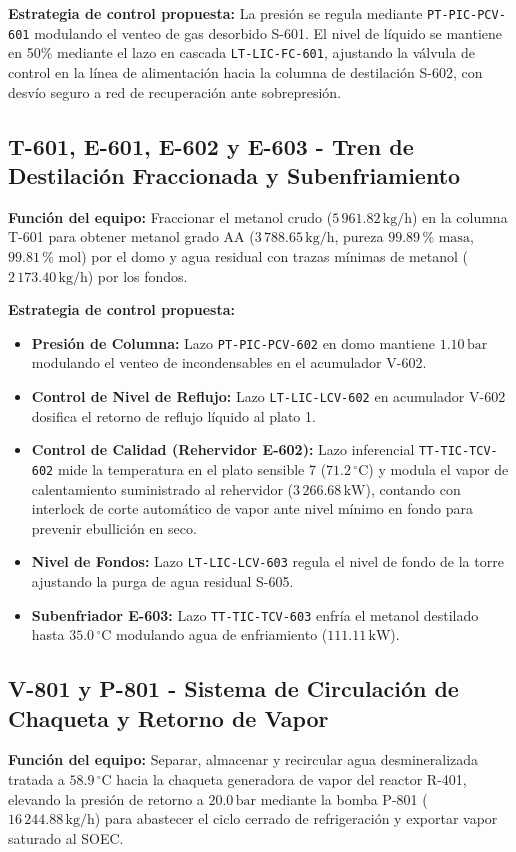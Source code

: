 \documentclass[10pt,letterpaper]{article}
\begin{document}
\textbf{Estrategia de control propuesta:} La presión se regula mediante \texttt{PT-PIC-PCV-601} modulando el venteo de gas desorbido S-601. El nivel de líquido se mantiene en 50\% mediante el lazo en cascada \texttt{LT-LIC-FC-601}, ajustando la válvula de control en la línea de alimentación hacia la columna de destilación S-602, con desvío seguro a red de recuperación ante sobrepresión.

\subsection{T-601, E-601, E-602 y E-603 - Tren de Destilación Fraccionada y Subenfriamiento}
\textbf{Función del equipo:} Fraccionar el metanol crudo ($5\,961.82\,\text{kg/h}$) en la columna T-601 para obtener metanol grado AA ($3\,788.65\,\text{kg/h}$, pureza $99.89\,\%\text{ masa}$, $99.81\,\%\text{ mol}$) por el domo y agua residual con trazas mínimas de metanol ($2\,173.40\,\text{kg/h}$) por los fondos.

\textbf{Estrategia de control propuesta:}
\begin{itemize}
    \item \textbf{Presión de Columna:} Lazo \texttt{PT-PIC-PCV-602} en domo mantiene $1.10\,\text{bar}$ modulando el venteo de incondensables en el acumulador V-602.
    \item \textbf{Control de Nivel de Reflujo:} Lazo \texttt{LT-LIC-LCV-602} en acumulador V-602 dosifica el retorno de reflujo líquido al plato 1.
    \item \textbf{Control de Calidad (Rehervidor E-602):} Lazo inferencial \texttt{TT-TIC-TCV-602} mide la temperatura en el plato sensible 7 ($71.2\,^\circ\text{C}$) y modula el vapor de calentamiento suministrado al rehervidor ($3\,266.68\,\text{kW}$), contando con interlock de corte automático de vapor ante nivel mínimo en fondo para prevenir ebullición en seco.
    \item \textbf{Nivel de Fondos:} Lazo \texttt{LT-LIC-LCV-603} regula el nivel de fondo de la torre ajustando la purga de agua residual S-605.
    \item \textbf{Subenfriador E-603:} Lazo \texttt{TT-TIC-TCV-603} enfría el metanol destilado hasta $35.0\,^\circ\text{C}$ modulando agua de enfriamiento ($111.11\,\text{kW}$).
\end{itemize}

\subsection{V-801 y P-801 - Sistema de Circulación de Chaqueta y Retorno de Vapor}
\textbf{Función del equipo:} Separar, almacenar y recircular agua desmineralizada tratada a $58.9\,^\circ\text{C}$ hacia la chaqueta generadora de vapor del reactor R-401, elevando la presión de retorno a $20.0\,\text{bar}$ mediante la bomba P-801 ($16\,244.88\,\text{kg/h}$) para abastecer el ciclo cerrado de refrigeración y exportar vapor saturado al SOEC.
\end{document}
